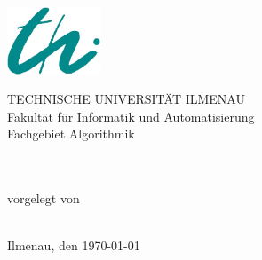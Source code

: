 \begin{titlepage}

\begin{center}
\includegraphics[height=2cm]{pics/logo-thi.jpg}
\vspace{1cm}

TECHNISCHE UNIVERSITÄT ILMENAU\\
Fakultät für Informatik und Automatisierung\\
Fachgebiet Algorithmik

\vspace{4cm}

{\large \sathema} \\ 
\vspace{1cm}
{\LARGE \normalfont \bfseries \layer} \\
\vspace{1cm}
{vorgelegt von} \\
\vspace{0.5cm}
{\large \saauthor}\\
{\large \matrikel}
\vspace{2cm}

\vspace{5cm}

Ilmenau, den \today
\end{center}

\end{titlepage}
